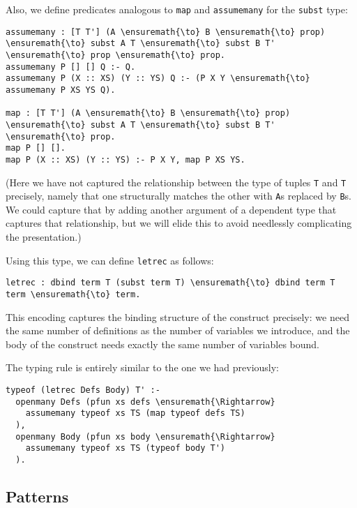 Also, we define predicates analogous to \texttt{map} and
\texttt{assumemany} for the \texttt{subst} type:

\begin{verbatim}
assumemany : [T T'] (A \ensuremath{\to} B \ensuremath{\to} prop) \ensuremath{\to} subst A T \ensuremath{\to} subst B T' \ensuremath{\to} prop \ensuremath{\to} prop.
assumemany P [] [] Q :- Q.
assumemany P (X :: XS) (Y :: YS) Q :- (P X Y \ensuremath{\to} assumemany P XS YS Q).

map : [T T'] (A \ensuremath{\to} B \ensuremath{\to} prop) \ensuremath{\to} subst A T \ensuremath{\to} subst B T' \ensuremath{\to} prop.
map P [] [].
map P (X :: XS) (Y :: YS) :- P X Y, map P XS YS.
\end{verbatim}

(Here we have not captured the relationship between the type of tuples
\texttt{T} and \texttt{T\textquotesingle{}} precisely, namely that one
structurally matches the other with \texttt{A}s replaced by \texttt{B}s.
We could capture that by adding another argument of a dependent type
that captures that relationship, but we will elide this to avoid
needlessly complicating the presentation.)

Using this type, we can define \texttt{letrec} as follows:

\begin{verbatim}
letrec : dbind term T (subst term T) \ensuremath{\to} dbind term T term \ensuremath{\to} term.
\end{verbatim}

This encoding captures the binding structure of the construct precisely:
we need the same number of definitions as the number of variables we
introduce, and the body of the construct needs exactly the same number
of variables bound.

The typing rule is entirely similar to the one we had previously:

\begin{verbatim}
typeof (letrec Defs Body) T' :-
  openmany Defs (pfun xs defs \ensuremath{\Rightarrow}
    assumemany typeof xs TS (map typeof defs TS)
  ),
  openmany Body (pfun xs body \ensuremath{\Rightarrow}
    assumemany typeof xs TS (typeof body T')
  ).
\end{verbatim}

\subsection{Patterns}\label{patterns}

